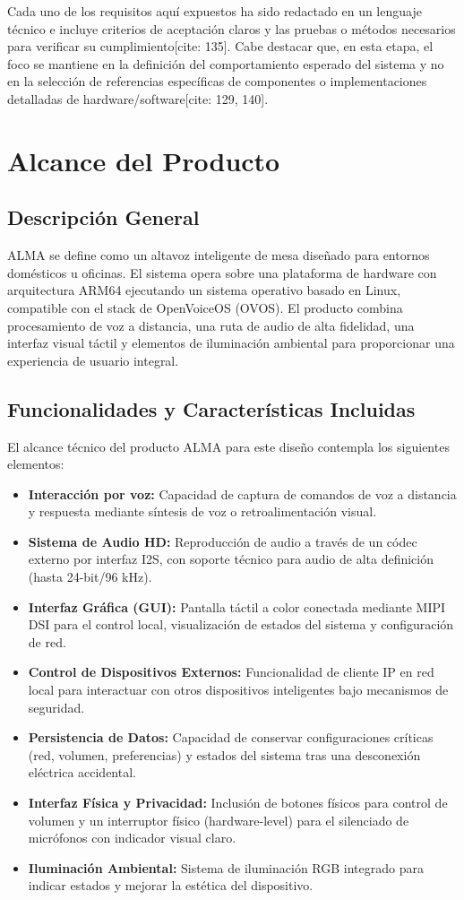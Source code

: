 \documentclass[%
	paper=a4,				%
	twoside=false,				%
	parskip=half,				%
	chapterprefix=false, 		%
	10pt,						%
	headings=normal,			%
	bibliography=totoc,			%
	listof=totoc,				%
	titlepage=on,				%
	captions=tableabove,		%
	draft=false,				%
]{scrbook}%
\begin{document}
Cada uno de los requisitos aquí expuestos ha sido redactado en un lenguaje técnico e incluye criterios de aceptación claros y las pruebas o métodos necesarios para verificar su cumplimiento[cite: 135]. Cabe destacar que, en esta etapa, el foco se mantiene en la definición del comportamiento esperado del sistema y no en la selección de referencias específicas de componentes o implementaciones detalladas de hardware/software[cite: 129, 140].
\chapter{Alcance del Producto}

\section{Descripción General}
ALMA se define como un altavoz inteligente de mesa diseñado para entornos domésticos u oficinas. El sistema opera sobre una plataforma de hardware con arquitectura ARM64 ejecutando un sistema operativo basado en Linux, compatible con el stack de OpenVoiceOS (OVOS). El producto combina procesamiento de voz a distancia, una ruta de audio de alta fidelidad, una interfaz visual táctil y elementos de iluminación ambiental para proporcionar una experiencia de usuario integral.

\section{Funcionalidades y Características Incluidas}
El alcance técnico del producto ALMA para este diseño contempla los siguientes elementos:
\begin{itemize}
    \item \textbf{Interacción por voz:} Capacidad de captura de comandos de voz a distancia y respuesta mediante síntesis de voz o retroalimentación visual.
    \item \textbf{Sistema de Audio HD:} Reproducción de audio a través de un códec externo por interfaz I2S, con soporte técnico para audio de alta definición (hasta 24-bit/96 kHz).
    \item \textbf{Interfaz Gráfica (GUI):} Pantalla táctil a color conectada mediante MIPI DSI para el control local, visualización de estados del sistema y configuración de red.
    \item \textbf{Control de Dispositivos Externos:} Funcionalidad de cliente IP en red local para interactuar con otros dispositivos inteligentes bajo mecanismos de seguridad.
    \item \textbf{Persistencia de Datos:} Capacidad de conservar configuraciones críticas (red, volumen, preferencias) y estados del sistema tras una desconexión eléctrica accidental.
    \item \textbf{Interfaz Física y Privacidad:} Inclusión de botones físicos para control de volumen y un interruptor físico (hardware-level) para el silenciado de micrófonos con indicador visual claro.
    \item \textbf{Iluminación Ambiental:} Sistema de iluminación RGB integrado para indicar estados y mejorar la estética del dispositivo.
\end{itemize}
\end{document}
